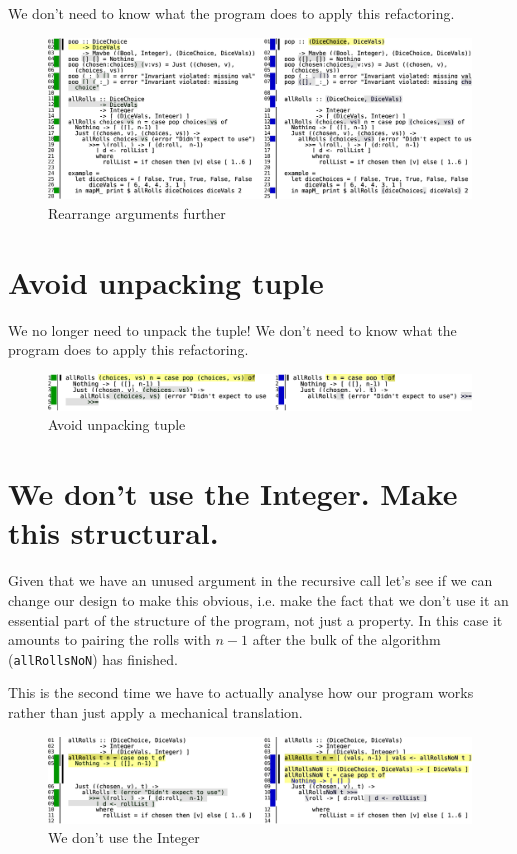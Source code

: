 We don't need to know what the program does to apply this refactoring.

\begin{figure}[htbp]
 \centering
 \includegraphics[width=\linewidth]{./pics/diff7.pdf}
 \caption{Rearrange arguments further}
 \label{fig:diff7}
\end{figure}

\section{Avoid unpacking tuple}


We no longer need to unpack the tuple! We don't need to know what the program does to apply this refactoring.

\begin{figure}[htbp]
 \centering
 \includegraphics[width=\linewidth]{./pics/diff8.pdf}
 \caption{Avoid unpacking tuple}
 \label{fig:diff8}
\end{figure}

\section{We don't use the Integer. Make this structural.}


Given that we have an unused argument in the recursive call let's see if we can change our design to make this obvious, i.e. make the fact that we don't use it an essential part of the structure of the program, not just a property. In this case it amounts to pairing the rolls with $n-1$ after the bulk of the algorithm (\texttt{allRollsNoN}) has finished.

This is the second time we have to actually analyse how our program works rather than just apply a mechanical translation.

\begin{figure}[htbp]
 \centering
 \includegraphics[width=\linewidth]{./pics/diff9.pdf}
 \caption{We don't use the Integer}
 \label{fig:diff9}
\end{figure}

